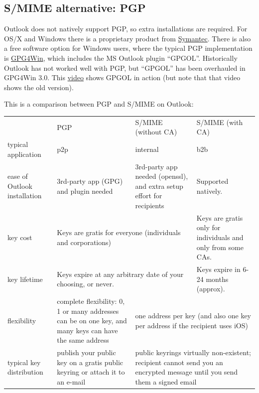 \documentclass[pdftex,12pt,titlepage=false]{scrartcl}
\begin{document}
\begin{appendices}%
  \begin{minipage}{\textwidth}%
    \section{S/MIME alternative: PGP}
    Outlook does not natively support PGP, so extra installations are
    required.  For OS/X and Windows there is a proprietary product from
    \href{https://www.symantec.com/products/desktop-email-encryption}{Symantec}.
    There is also a free software option for Windows users, where the
    typical PGP implementation is
    \href{https://www.gpg4win.org/version3.html}{GPG4Win}, which includes
    the MS Outlook plugin ``GPGOL''.  Historically Outlook has not worked
    well with PGP, but ``GPGOL'' has been overhauled in GPG4Win 3.0.  This
    \href{https://www.youtube.com/watch?v=-TOUeTFUfgQ}{video} shows GPGOL
    in action (but note that that video shows the old version).

    This is a comparison between PGP and S/MIME on Outlook:\\[1em]


    \begin{tabular}{p{}|p{}|p{}|p{}}
      & PGP & S/MIME \newline\small(without CA) & S/MIME \newline\small(with CA)\\
      typical application & p2p & internal & b2b\\
      ease of Outlook installation & 3rd-party app (GPG) and plugin needed & 3rd-party app needed (openssl), and extra setup effort for recipients & Supported natively.\\
      key cost & \multicolumn{2}{D}{Keys are gratis for everyone (individuals and corporations)} & Keys are gratis only for individuals and only from some CAs.\\
      key lifetime & \multicolumn{2}{D}{Keys expire at any arbitrary date of your choosing, or never.} & Keys expire in 6-24 months (approx).\\
      flexibility & complete flexibility: 0, 1 or many addresses can be on one key, and many keys can have the same address & \multicolumn{2}{S}{one address per key (and also one key per address if the recipient uses iOS)}\\
      typical key distribution & publish your public key on a gratis public keyring or attach it to an e-mail & \multicolumn{2}{S}{public keyrings virtually non-existent; recipient cannot send you an encrypted message until you send them a signed email}\\
    \end{tabular}
  \end{minipage}
\end{appendices}
\end{document}
